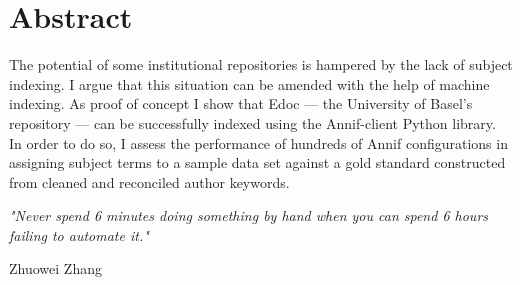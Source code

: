\hypertarget{abstract}{%
	\section*{Abstract}\label{abstract}}

The potential of some institutional repositories is hampered by the lack of subject indexing. I argue that this situation can be amended with the help of machine indexing. As proof of concept I show that Edoc --- the University of Basel's repository --- can be successfully indexed using the Annif-client Python library. In order to do so, I assess the performance of hundreds of Annif configurations in assigning subject terms to a sample data set against a gold standard constructed from cleaned and reconciled author keywords.

\newpage

\emph{"Never spend 6 minutes doing something by hand when you can spend 6 hours failing to automate it."}

Zhuowei Zhang